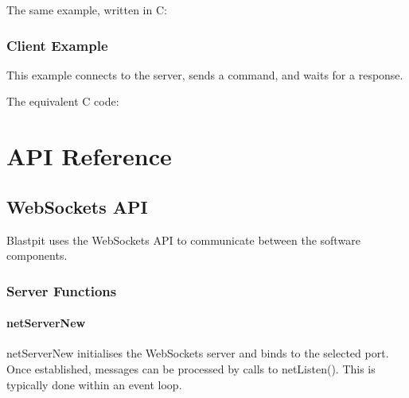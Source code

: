 \documentclass[12pt,fleqn]{book} %
\begin{document}

The same example, written in C:


\section{Client Example}

This example connects to the server, sends a command, and waits for a response.


The equivalent C code:




\part{API Reference}

\chapter{WebSockets API}

Blastpit uses the WebSockets API to communicate between the software components.

\section{Server Functions}

\subsection{netServerNew}

netServerNew initialises the WebSockets server and binds to the selected port. Once established, messages can be processed by calls to netListen(). This is typically done within an event loop.
\end{document}
